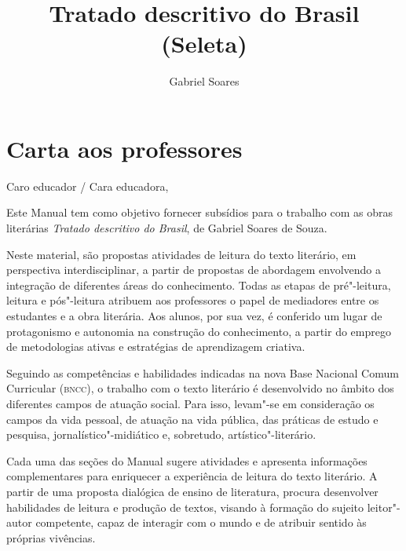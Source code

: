 \documentclass[12pt]{extarticle}
\begin{document}
\newcommand{\AutorLivro}{Gabriel Soares}
\newcommand{\TituloLivro}{Tratado descritivo do Brasil (Seleta)}
\newcommand{\Tema}{Diálogos com a sociologia e com a antropologia}
\newcommand{\Genero}{Diário, biografia, autobiografia, relatos, memórias}
\newcommand{\issnppub}{---}
\newcommand{\issnepub}{---}
\newcommand{\colaborador}{\textbf{Bruno Gradella e Vicente Castro} é uma pessoa incrível e vai fazer um bom serviço.}

{}
\title{\TituloLivro}
\author{\AutorLivro}
\def\authornotes{\colaborador}

\date{}
\maketitle
\tableofcontents

\pagebreak

\section{Carta aos professores}

Caro educador / Cara educadora,\\\bigskip

Este Manual tem como objetivo fornecer subsídios para o trabalho com as
obras literárias \emph{Tratado descritivo do Brasil}, de Gabriel Soares
de Souza.

Neste material, são propostas atividades de leitura do texto literário,
em perspectiva interdisciplinar, a partir de propostas de abordagem
envolvendo a integração de diferentes áreas do conhecimento. Todas as
etapas de pré"-leitura, leitura e pós"-leitura atribuem aos professores o
papel de mediadores entre os estudantes e a obra literária. Aos alunos,
por sua vez, é conferido um lugar de protagonismo e autonomia na
construção do conhecimento, a partir do emprego de metodologias ativas e
estratégias de aprendizagem criativa.

Seguindo as competências e habilidades indicadas na nova Base Nacional
Comum Curricular (\textsc{bncc}), o trabalho com o texto literário é desenvolvido
no âmbito dos diferentes campos de atuação social. Para isso, levam"-se
em consideração os campos da vida pessoal, de atuação na vida pública,
das práticas de estudo e pesquisa, jornalístico"-midiático e, sobretudo,
artístico"-literário.

Cada uma das seções do Manual sugere atividades e apresenta informações
complementares para enriquecer a experiência de leitura do texto
literário. A partir de uma proposta dialógica de ensino de literatura,
procura desenvolver habilidades de leitura e produção de textos, visando
à formação do sujeito leitor"-autor competente, capaz de interagir com o
mundo e de atribuir sentido às próprias vivências.
\end{document}
